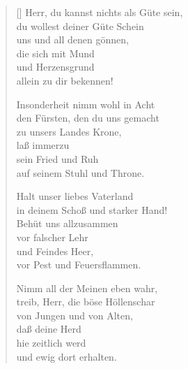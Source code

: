 \begin{multicols}{2}
\begin{verse}[\versewidth]
 Herr, du kannst nichts als Güte sein,\\
du wollest deiner Güte Schein\\
uns und all denen gönnen,\\
die sich mit Mund\\
und Herzensgrund\\
allein zu dir bekennen!

 Insonderheit nimm wohl in Acht\\
den Fürsten, den du uns gemacht\\
zu unsers Landes Krone,\\
laß immerzu\\
sein Fried und Ruh\\
auf seinem Stuhl und Throne.

 Halt unser liebes Vaterland\\
in deinem Schoß und starker Hand!\\
Behüt uns allzusammen\\
vor falscher Lehr\\
und Feindes Heer,\\
vor Pest und Feuersflammen.

 Nimm all der Meinen eben wahr,\\
treib, Herr, die böse Höllenschar\\
von Jungen und von Alten,\\
daß deine Herd\\
hie zeitlich werd\\
und ewig dort erhalten.

\end{verse}
\end{multicols}
